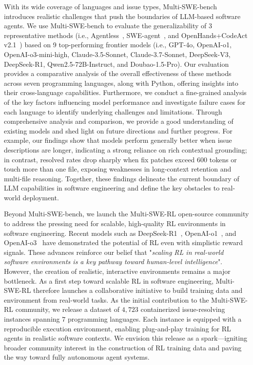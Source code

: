 \documentclass[11pt, a4paper, logo, copyright, nonumbering]{seed}
\newcommand{\multiswebench}{Multi-SWE-bench\xspace}
\newcommand{\multiswerl}{Multi-SWE-RL\xspace}
\newcommand{\agentless}{Agentless\xspace}
\newcommand{\sweagent}{SWE-agent\xspace}
\newcommand{\openhands}{OpenHands\xspace}
\begin{document}
With its wide coverage of languages and issue types, \multiswebench introduces realistic challenges that push the boundaries of LLM-based software agents.
We use \multiswebench to evaluate the generalizability of 3 representative methods (i.e., \agentless~\citep{xia2024agentless}, \sweagent~\citep{yang2024sweagent}, and \openhands+CodeAct v2.1~\citep{openhands}) based on 9 top-performing frontier models (i.e., GPT-4o, OpenAI-o1, OpenAI-o3-mini-high, Claude-3.5-Sonnet, Claude-3.7-Sonnet, DeepSeek-V3, DeepSeek-R1, Qwen2.5-72B-Instruct, and Doubao-1.5-Pro).
Our evaluation provides a comparative analysis of the overall effectiveness of these methods across seven programming languages, along with Python, offering insights into their cross-language capabilities. 
Furthermore, we conduct a fine-grained analysis of the key factors influencing model performance and investigate failure cases for each language to identify underlying challenges and limitations.
Through comprehensive analysis and comparison, we provide a good understanding of existing models and shed light on future directions and further progress.
For example, our findings show that models perform generally better when issue descriptions are longer, indicating a strong reliance on rich contextual grounding; 
in contrast, resolved rates drop sharply when fix patches exceed $600$ tokens or touch more than one file, exposing weaknesses in long-context retention and multi-file reasoning.
Together, these findings delineate the current boundary of LLM capabilities in software engineering and define the key obstacles to real-world deployment.

Beyond \multiswebench, we launch the \multiswerl open-source community to address the pressing need for scalable, high-quality RL environments in software engineering.
Recent models such as DeepSeek-R1~\citep{deepseekr1}, OpenAI-o1~\citep{openaio1}, and OpenAI-o3~\citep{openai_o3_mini} have demonstrated the potential of RL even with simplistic reward signals.
These advances reinforce our belief that "\textit{scaling RL in real-world software environments is a key pathway toward human-level intelligence}".
However, the creation of realistic, interactive environments remains a major bottleneck.
As a first step toward scalable RL in software engineering, \multiswerl therefore launches a collaborative initiative to build training data and environment from real-world tasks.
As the initial contribution to the \multiswerl community, we release a dataset of $4,723$ containerized issue-resolving instances spanning $7$ programming languages.
Each instance is equipped with a reproducible execution environment, enabling plug-and-play training for RL agents in realistic software contexts.
We envision this release as a spark—igniting broader community interest in the construction of RL training data 
and paving the way toward fully autonomous agent systems.
\end{document}
